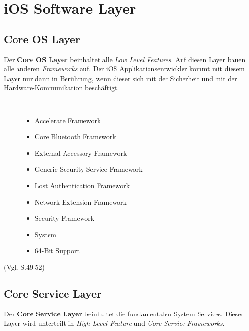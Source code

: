 \section{iOS Software Layer}
\label{sec:iOSSWLayer}
\subsection{Core OS Layer}
\label{sec:CoreLayer}
Der \textbf{Core OS Layer} beinhaltet alle \textit{\glqq Low Level Features\grqq}. Auf diesen Layer bauen alle anderen \textit{\glqq Frameworks\grqq{}} auf. Der iOS Applikationsentwickler kommt mit diesem Layer nur dann in Berührung, wenn dieser sich mit der Sicherheit und mit der Hardware-Kommunikation beschäftigt. 
\begin{description}
	\item[\parbox{\textwidth} {Das Core OS Layer Framework beinhaltet folgende Frameworks}]~\par
	\begin{itemize}
		\item Accelerate Framework
		\item Core Bluetooth Framework
		\item External Accessory Framework
		\item Generic Security Service Framework
		\item Lost Authentication Framework
		\item Network Extension Framework
		\item Security Framework
		\item System
		\item 64-Bit Support
	\end{itemize}
\end{description}
 (Vgl. \cite{Apple[6]} S.49-52) 
 
\subsection{Core Service Layer}
\label{sec:CoreServiceLayer}		
Der \textbf{Core Service Layer} beinhaltet die fundamentalen System Services. Dieser Layer wird unterteilt in \textit{\glqq High Level Feature\grqq{}} und \textit{\glqq Core Service Frameworks\grqq{}}.

